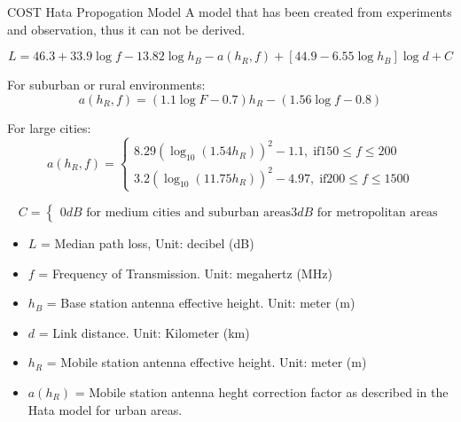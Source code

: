 \begin{definitionblock}{COST Hata Propogation Model}
    A model that has been created from experiments and observation, thus it can not be derived.

    \begin{equation}
        L = 46.3 + 33.9\log{f} - 13.82\log{h_B} - a(h_R,f) + [44.9 - 6.55\log{h_B}]\log{d} + C
    \end{equation}

    For suburban or rural environments:
    \begin{equation}
        a(h_R,f) = (1.1\log{F} - 0.7)h_R - (1.56\log{f} - 0.8)
    \end{equation}

    For large cities:
    \begin{equation}
        a(h_R,f) = 
        \begin{cases} 
            8.29 ( \log_{10}(1.54h_R))^2 - 1.1, \; \text{if} 150 \leq f \leq 200 \\
            3.2 ( \log_{10}(11.75h_R))^2 - 4.97, \; \text{if} 200 \leq f \leq 1500
        \end{cases} 
    \end{equation}

    \begin{equation}
        C =
        \begin{cases} 
            0 dB \text{ for medium cities and suburban areas} 
            3 dB \text{ for metropolitan areas} 
        \end{cases} 
    \end{equation}

    \begin{itemize}
        \item $L$ = Median path loss, Unit: decibel (dB)
        \item $f$ = Frequency of Transmission. Unit: megahertz (MHz)
        \item $h_B$ = Base station antenna effective height. Unit: meter (m)
        \item $d$ = Link distance. Unit: Kilometer (km)
        \item $h_R$ = Mobile station antenna effective height. Unit: meter (m)
        \item $a(h_R)$ = Mobile station antenna heght correction factor as described in the Hata model for urban areas.
    \end{itemize}
\end{definitionblock}

